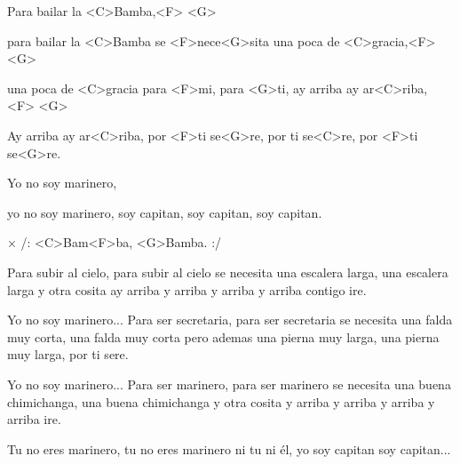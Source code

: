 
\zs
Para bailar la <C>Bamba,<F> <G> 

para bailar la <C>Bamba se <F>nece<G>sita
una poca de <C>gracia,<F> <G> 

una poca de <C>gracia para <F>mi, para <G>ti,
ay arriba ay ar<C>riba, <F> <G>

Ay arriba ay ar<C>riba, por <F>ti se<G>re,
por ti se<C>re, por <F>ti se<G>re.

Yo no soy marinero,

yo no soy marinero, soy capitan,
soy capitan, soy capitan.
\ks

× /: <C>Bam<F>ba, <G>Bamba. :/
\kr

\zs
Para subir al cielo,
para subir al cielo se necesita una escalera larga,
una escalera larga y otra cosita ay arriba y arriba
y arriba y arriba contigo ire.

Yo no soy marinero...
\ks
\zr \kr
\zs
Para ser secretaria,
para ser secretaria se necesita una falda muy corta,
una falda muy corta pero ademas una pierna muy larga,
una pierna muy larga, por ti sere.

Yo no soy marinero...
\ks
\zs
Para ser marinero,
para ser marinero se necesita una buena chimichanga,
una buena chimichanga y otra cosita y arriba y arriba
y arriba y arriba ire.

Tu no eres marinero, tu no eres marinero ni tu ni él,
yo soy capitan soy capitan...
\ks
\kp


